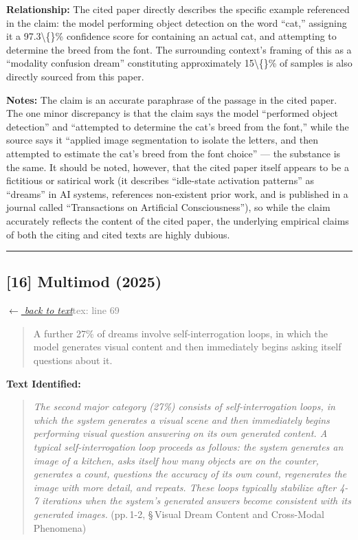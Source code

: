 \smallskip
\noindent \textbf{Relationship:} The cited paper directly describes the specific example referenced in the claim: the model performing object detection on the word ``cat,'' assigning it a 97.3\textbackslash\{\}\% confidence score for containing an actual cat, and attempting to determine the breed from the font. The surrounding context's framing of this as a ``modality confusion dream'' constituting approximately 15\textbackslash\{\}\% of samples is also directly sourced from this paper.

\smallskip
\noindent \textbf{Notes:} The claim is an accurate paraphrase of the passage in the cited paper. The one minor discrepancy is that the claim says the model ``performed object detection'' and ``attempted to determine the cat's breed from the font,'' while the source says it ``applied image segmentation to isolate the letters, and then attempted to estimate the cat's breed from the font choice'' — the substance is the same. It should be noted, however, that the cited paper itself appears to be a fictitious or satirical work (it describes ``idle-state activation patterns'' as ``dreams'' in AI systems, references non-existent prior work, and is published in a journal called ``Transactions on Artificial Consciousness''), so while the claim accurately reflects the content of the cited paper, the underlying empirical claims of both the citing and cited texts are highly dubious.

\medskip
\noindent\rule{\textwidth}{0.2pt}
\medskip
\subsection*{[16] Multimod (2025)}
\hypertarget{appendix:group_69}{}

\noindent \hyperlink{claim:group_69}{\textit{$\leftarrow$ back to text}}\hfill \textcolor{gray}{tex: line 69}
\smallskip

\begin{quote}
A further 27\% of dreams involve self-interrogation loops, in which the model generates visual content and then immediately begins asking itself questions about it.
\end{quote}
\noindent{}
\smallskip

\noindent \textbf{Text Identified:}
\begin{quote}
\textit{The second major category (27\%) consists of self-interrogation loops, in which the system generates a visual scene and then immediately begins performing visual question answering on its own generated content. A typical self-interrogation loop proceeds as follows: the system generates an image of a kitchen, asks itself how many objects are on the counter, generates a count, questions the accuracy of its own count, regenerates the image with more detail, and repeats. These loops typically stabilize after 4-7 iterations when the system's generated answers become consistent with its generated images.} (pp.\,1-2, \S\,Visual Dream Content and Cross-Modal Phenomena)
\end{quote}


